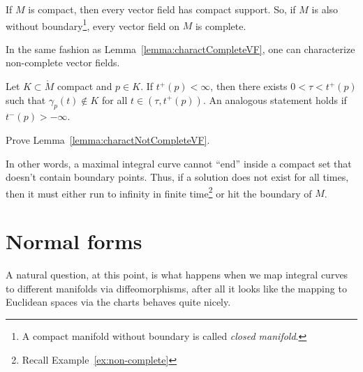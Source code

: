 \begin{corollary}
	If $M$ is compact, then every vector field has compact support.
	So, if $M$ is also without boundary\footnote{A compact manifold without boundary is called \emph{closed manifold}.}, every vector field on $M$ is complete.
\end{corollary}

In the same fashion as Lemma~\ref{lemma:charactCompleteVF}, one can characterize non-complete vector fields.

\begin{lemma}\label{lemma:charactNotCompleteVF}
	Let $K\subset \mathring M$ compact and $p\in K$.
	If $t^+(p) < \infty$, then there exists $0<\tau<t^+(p)$ such that $\gamma_p(t)\not\in K$ for all $t\in (\tau, t^+(p))$.
	An analogous statement holds if $t^-(p) > -\infty$.
\end{lemma}

\begin{exercise}
	Prove Lemma~\ref{lemma:charactNotCompleteVF}.
\end{exercise}

In other words, a maximal integral curve cannot ``end'' inside a compact set that doesn't contain boundary points.
Thus, if a solution does not exist for all times, then it must either run to infinity in finite time\footnote{Recall Example~\ref{ex:non-complete}} or hit the boundary of $M$.

\section{Normal forms}

A natural question, at this point, is what happens when we map integral curves to different manifolds via diffeomorphisms, after all it looks like the mapping to Euclidean spaces via the charts behaves quite nicely.

